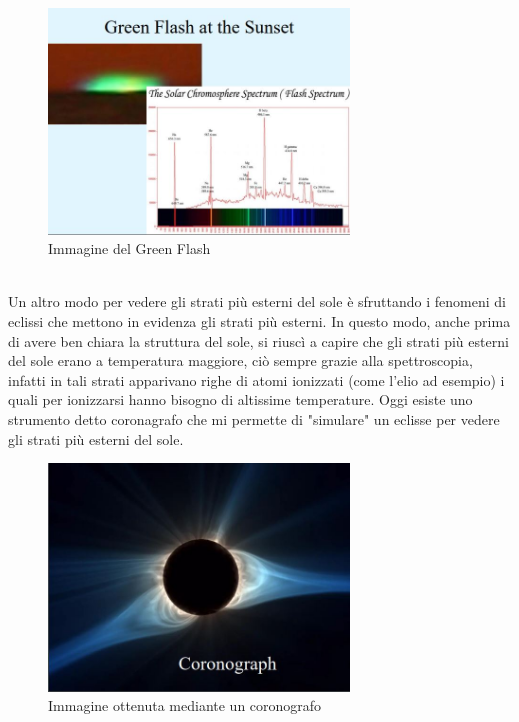 \documentclass[a4paper,11pt]{article}
\begin{document}
        \\
        \begin{figure}[h!!]
            \centering
                \includegraphics[width=8cm]{2dic/GreenFlash.jpg}
                \caption{Immagine del Green Flash}
            \label{fig:GF}
        \end{figure}
        \\
        Un altro modo per vedere gli strati più esterni del sole è sfruttando i fenomeni di eclissi che mettono in evidenza gli strati più esterni. In questo modo, anche prima di avere ben chiara la struttura del sole, si riuscì a capire che gli strati più esterni del sole erano a temperatura maggiore, ciò sempre grazie alla spettroscopia, infatti in tali strati apparivano righe di atomi ionizzati (come l'elio ad esempio) i quali per ionizzarsi hanno bisogno di altissime temperature.
        Oggi esiste uno strumento detto coronagrafo che mi permette di "simulare" un eclisse per vedere gli strati più esterni del sole.
        \\
        
        \begin{figure}[h!!]
            \centering
                \includegraphics[width=8cm]{2dic/Coronografo.jpg}
                \caption{Immagine ottenuta mediante un coronografo}
            \label{fig:Coronografo}
        \end{figure}
        
\end{document}
